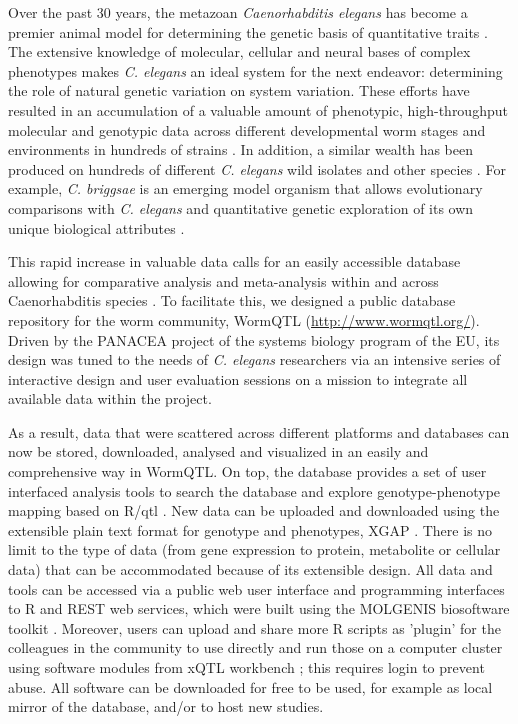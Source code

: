 Over the past 30 years, the metazoan \emph{Caenorhabditis elegans} has become a premier animal model for 
determining the genetic basis of quantitative traits \cite{Gaertner:2010, Kammenga:2008}. The 
extensive knowledge of molecular, cellular and neural bases of complex phenotypes makes 
\emph{C. elegans} an ideal system for the next endeavor: determining the role of natural genetic 
variation on system variation. These efforts have resulted in an accumulation of a valuable amount 
of phenotypic, high-throughput molecular and genotypic data across different developmental worm 
stages and environments in hundreds of strains \cite{Palopoli:2008, Kammenga:2007, Rockman:2010, 
McGrath:2009, Reddy:2009, Doroszuk:2009, Li:2010, Gutteling:2007, Vinuela:2010}. In addition, a similar wealth has been 
produced on hundreds of different \emph{C. elegans} wild isolates and other species \cite{Andersen:2012}. 
For example, \emph{C. briggsae} is an emerging model organism that allows evolutionary comparisons 
with \emph{C. elegans} and quantitative genetic exploration of its own unique biological 
attributes \cite{Ross:2011}.

This rapid increase in valuable data calls for an easily accessible database allowing for 
comparative analysis and meta-analysis within and across Caenorhabditis species \cite{Swertz:2007}. To 
facilitate this, we designed a public database repository for the worm community, WormQTL 
(\url{http://www.wormqtl.org/}). Driven by the PANACEA project of the systems biology program of 
the EU, its design was tuned to the needs of \emph{C. elegans} researchers via an intensive 
series of interactive design and user evaluation sessions on a mission to integrate all 
available data within the project.

As a result, data that were scattered across different platforms and databases can now be 
stored, downloaded, analysed and visualized in an easily and comprehensive way in WormQTL. 
On top, the database provides a set of user interfaced analysis tools to search the database 
and explore genotype-phenotype mapping based on R/qtl \cite{Broman:2003, Arends:2010}. New 
data can be uploaded and downloaded using the extensible plain text format for genotype and 
phenotypes, XGAP \cite{Swertz:2010a}. There is no limit to the type of data (from gene 
expression to protein, metabolite or cellular data) that can be accommodated because of its 
extensible design. All data and tools can be accessed via a public web user interface and 
programming interfaces to R and REST web services, which were built using the MOLGENIS 
biosoftware toolkit \cite{Swertz:2010b}. Moreover, users can upload and share more R 
scripts as 'plugin' for the colleagues in the community to use directly and run those on a 
computer cluster using software modules from xQTL workbench \cite{Arends:2012, Snoek:2012}; this requires 
login to prevent abuse. All software can be downloaded for free to be used, for example as 
local mirror of the database, and/or to host new studies.


